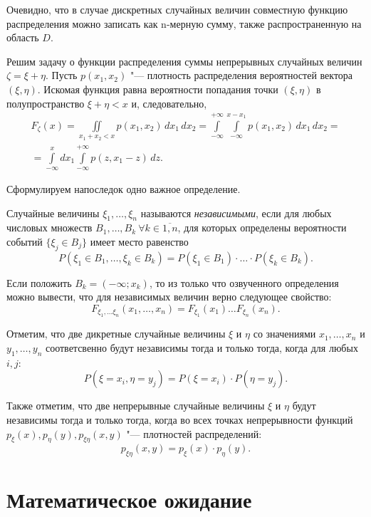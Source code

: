 Очевидно, что в случае дискретных случайных величин совместную функцию распределения можно записать как n-мерную сумму, также распространенную на область $D$.


Решим задачу о функции распределения суммы непрерывных случайных величин $\zeta=\xi+\eta$. Пусть $p(x_1,x_2)$ "--- плотность распределения вероятностей вектора $(\xi,\eta)$. Искомая функция равна вероятности попадания точки $(\xi,\eta)$ в полупространство $\xi+\eta<x$ и, следовательно, 
\begin{multline}\label{ch31.1eq1}
F_{\zeta}(x)=\iint\limits_{x_1+x_2<x} p(x_1,x_2)\,dx_1\,dx_2=\int\limits_{-\infty}^{+\infty}\int\limits_{-\infty}^{x-x_1}p(x_1,x_2)\,dx_1\,dx_2=\\
=\int\limits_{-\infty}^{x}dx_1\int\limits_{-\infty}^{+\infty} p(z,x_1-z)\,dz.
\end{multline}

Сформулируем напоследок одно важное определение.
\begin{defn} Случайные величины $\xi_1,\dots,\xi_n$ называются \textit{независимыми}, если для любых числовых множеств $B_1,\dots, B_k\ \forall k\in\overline{1,n}$, для которых определены вероятности событий $\{\xi_j\in B_j\}$ имеет место равенство
$$
P(\xi_1\in B_1,\dots, \xi_k \in B_k)=P(\xi_1\in B_1)\cdot\dots\cdot P(\xi_k \in B_k).
$$
\end{defn}

Если положить $B_k=(-\infty;x_k)$, то из только что озвученного определения можно вывести, что для независимых величин верно следующее свойство:
$$
F_{\xi_1,\dots\xi_n}(x_1,\dots,x_n)=F_{\xi_1}(x_1)\dots F_{\xi_n}(x_n).
$$

Отметим, что две дикретные случайные величины $\xi$ и $\eta$ со значениями $x_1,\dots,x_n$ и $y_1,\dots,y_n$ соответсвенно будут независимы тогда и только тогда, когда для любых $i,j$:
$$
P(\xi = x_i, \eta = y_j) = P (\xi = x_i)\cdot P(\eta=y_j).
$$

Также отметим, что две непрерывные случайные величины $\xi$ и $\eta$ будут независимы тогда и только тогда, когда во всех точках непрерывности функций $p_\xi(x),p_\eta(y),p_{\xi\eta}(x,y)$ "--- плотностей распределений:
$$
p_{\xi\eta}(x,y)=p_\xi(x)\cdot p_\eta(y).
$$ 

\section{Математическое ожидание}

